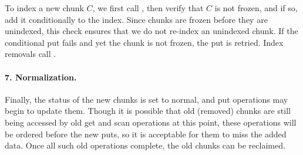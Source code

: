 To index a new chunk $C$, we first call , then verify that $C$ is not frozen, and if so,
add it conditionally to the index. 
Since chunks are frozen before they are unindexed, this check ensures that we do not re-index an unindexed chunk.
If the conditional put fails and yet the chunk is not frozen, the put is retried.
Index removals call .

\paragraph{7. Normalization.}
Finally, the status of the new chunks is set to normal, and put operations may begin to update them.
Though it is possible that old (removed) chunks are still being accessed by old get and scan operations at this point, these operations will
be ordered before the new puts, so it is acceptable for them to miss the added data. Once all such old operations complete, the
old chunks can be reclaimed.

